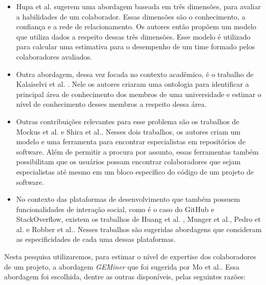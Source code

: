 \begin{itemize}
\item Hupa et al.\cite{hupa2010interdisciplinary} sugerem uma abordagem baseada em três dimensões, para avaliar a  habilidades de um colaborador. Essas dimensões são o conhecimento, a confiança e a rede de relacionamento. Os autores então propõem um modelo que utiliza dados a respeito dessas três dimensões. Esse modelo é utilizado para calcular uma estimativa para o desempenho de um time formado pelos colaboradores avaliados.
\item Outra abordagem, dessa vez focada no contexto acadêmico, é o trabalho de Kalaiselvi et al. \cite{kalaiselvi2013ontological}. Nele os autores criaram uma ontologia para identificar a principal área de conhecimento dos membros de uma universidade e estimar o nível de conhecimento desses membros a respeito dessa área.
\item  Outras contribuições relevantes para esse problema são os trabalhos de Mockus et al.\cite{mockus2002expertise} e Shira et al.\cite{shira2011expert}. Nesses dois trabalhos, os autores criam um modelo  e uma ferramenta para encontrar especialistas em repositórios de software. Além de permitir a procura por assunto, essas ferramentas também possibilitam que os usuários possam encontrar colaboradores que sejam especialistas até mesmo em um bloco específico do código de um projeto de software.
\item No contexto das plataformas de desenvolvimento que também possuem funcionalidades de interação social, como é o caso do GitHub e StackOverflow, existem os trabalhos de Huang et al. \cite{huang2017expert}, Munger et al.\cite{munger2014automatically}, Pedro et al.\cite{san2013multiple} e Robber et al.\cite{robbes2013using}. Nesses trabalhos são sugeridas  abordagens que consideram as especificidades  de cada uma dessas plataformas.
\end{itemize}    

Nesta pesquisa utilizaremos,  para estimar o nível de expertise dos colaboradores de um projeto,  a abordagem \textit{GEMiner} que foi sugerida por Mo et al.\cite{mo2015geminer}.  Essa abordagem foi escolhida, dentre as outras disponíveis, pelas seguintes razões:

